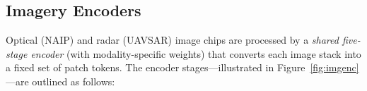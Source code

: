 \documentclass[remotesensing,article,accept,pdftex,moreauthors]{Definitions/mdpi}
\begin{document}
\subsection{Imagery Encoders}
\label{sec:img_enc}



Optical (NAIP) and radar (UAVSAR) image chips are processed by a \emph{shared five-stage encoder} (with modality-specific weights) that converts each image stack into a fixed set of patch tokens. The encoder stages—illustrated in Figure~\ref{fig:imgenc}—are outlined as follows:
\end{document}

